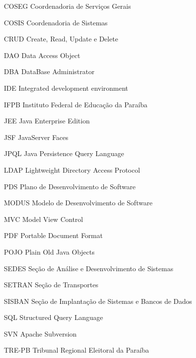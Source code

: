
\begin{siglas}
    \item[COSEG] Coordenadoria de Serviços Gerais
    \item[COSIS] Coordenadoria de Sistemas
    \item[CRUD] Create, Read, Update e Delete
    \item[DAO] Data Access Object 
    \item[DBA] DataBase Administrator
    \item[IDE] Integrated development environment
    \item[IFPB] Instituto Federal de Educação da Paraíba
    \item[JEE] Java Enterprise Edition
    \item[JSF] JavaServer Faces
    \item[JPQL] Java Persistence Query Language
    \item[LDAP] Lightweight Directory Access Protocol
    \item[PDS] Plano de Desenvolvimento de Software
    \item[MODUS] Modelo de Desenvolvimento de Software
    \item[MVC] Model View Control
    \item[PDF] Portable Document Format
    \item[POJO] Plain Old Java Objects
    \item[SEDES] Seção de Análise e Desenvolvimento de Sistemas
    \item[SETRAN] Seção de Transportes
    \item[SISBAN]Seção de Implantação de Sistemas e Bancos de Dados
    \item[SQL] Structured Query Language
    \item[SVN] Apache Subversion
    \item[TRE-PB] Tribunal Regional Eleitoral da Paraíba
\end{siglas}

